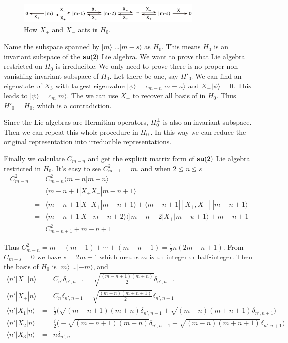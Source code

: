 \documentclass[12pt]{book}
\begin{document}
	\begin{figure}[htb]
		\centering  
		\includegraphics[width=0.8\textwidth ]{resources/figures/3_2_su2.pdf}
		\caption{How $X_+$ and $X_-$ acts in $H_0$.}
		\label{fig:su2} 
	\end{figure}
		
	
	Name the subspace spanned by $|m\rangle$ \dots $|m-s\rangle$ as $H_0$. This means $H_0$ is an invariant subspace of the ${\bf su}(2)$ Lie algebra. We want to prove that Lie algebra restricted on $H_0$ is irreducible. We only need to prove there is no proper non-vanishing invariant subspace of $H_0$. Let there be one, say $H'_0$. We can find an eigenstate of $X_3$ with largest eigenvalue $|\psi\rangle=c_{m-n}|m-n\rangle$ and $X_+|\psi\rangle=0$. This leads to $|\psi\rangle=c_m|m\rangle$. The we can use $X_-$ to recover all basis of in $H_0$. Thus $H'_0=H_0$, which is a contradiction. 
	
	Since the Lie algebras are Hermitian operators, $H_0^\perp$ is also an invariant subspace. Then we can repeat this whole procedure in $H_0^\perp$. In this way we can reduce the original representation into irreducible representations.

	Finally we calculate $C_{m-n}$	and get the explicit matrix form of ${\bf su}(2)$ Lie algebra restricted in $H_0$. It's easy to see $C^2_{m-1}=m$, and when $2\leq n\leq s$
	\begin{eqnarray}
		C_{m-n}^2&=&C_{m-n}^2\langle m-n|m-n\rangle\\
		&=&\langle m-n+1|X_+X_-|m-n+1\rangle\\
		&=&\langle m-n+1|X_-X_+|m-n+1\rangle+\langle m-n+1|[X_+,X_-]|m-n+1\rangle\\
		&=&\langle m-n+1|X_-|m-n+2\rangle \langle|m-n+2|X_+|m-n+1\rangle+ m-n+1\\
		&=&C_{m-n+1}^2+ m-n+1
	\end{eqnarray}
	
	Thus $C_{m-n}^2=m+(m-1)+\cdots+(m-n+1)=\frac 12 n(2m-n+1)$. From $C_{m-s}=0$ we have $s=2m+1$ which means $m$ is an integer or half-integer. Then the basis of $H_0$ is $|m\rangle$ \dots $|-m\rangle$, and
	\begin{eqnarray}
		\langle n'|X_-|n\rangle&=&C_{n'}\delta_{n',n-1}=\sqrt{\frac {(m-n+1)(m+n)}2}\delta_{n',n-1}\\
		\langle n'|X_+|n\rangle&=&C_{n}\delta_{n',n+1}=\sqrt{\frac {(m-n)(m+n+1)}2}\delta_{n',n+1}\\
		\langle n'|X_1|n\rangle&=&\frac 12\big(\sqrt{(m-n+1)(m+n)}\delta_{n',n-1}+\sqrt{(m-n)(m+n+1)}\delta_{n',n+1}\big)\\
		\langle n'|X_2|n\rangle&=&\frac i2\big(-\sqrt{(m-n+1)(m+n)}\delta_{n',n-1}+\sqrt{(m-n)(m+n+1)}\delta_{n',n+1}\big)\\
		\langle n'|X_3|n\rangle&=&n\delta_{n',n}
	\end{eqnarray}
	
\end{document}
